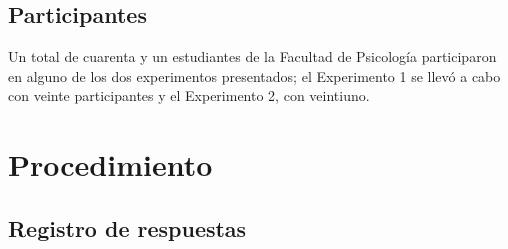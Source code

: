 
\subsection{Participantes}

Un total de cuarenta y un estudiantes de la Facultad de Psicología participaron en alguno de los dos experimentos presentados; el Experimento 1 se llevó a cabo con veinte participantes y el Experimento 2, con veintiuno. 

\section{Procedimiento}

\subsection{Registro de respuestas}